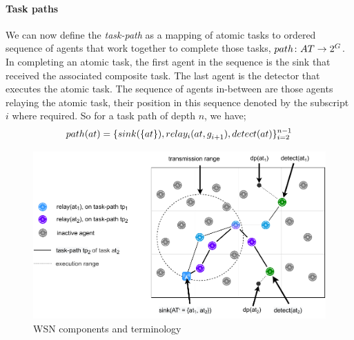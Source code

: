 
\paragraph{Task paths}
We can now define the \textit{task-path} as a mapping of atomic tasks to ordered sequence of agents that work together to complete those tasks, $\formalTaskArc{}{}$. In completing an atomic task, the first agent in the sequence is the sink that received the associated composite task. The last agent is the detector that executes the atomic task. The sequence of agents in-between are those agents relaying the atomic task, their position in this sequence denoted by the subscript $i$ where required. So for a task path of depth $n$, we have;
\begin{equation}
	\functionTaskArc{}{} = \lbrace \functionSinkRoleAtomic{}{}, \functionRelayRole{i}{i+1}, \functionDetectorRole{}{} \rbrace_{i=2}^{n-1}
\end{equation}
\begin{figure}
	\centering 
	\includegraphics[width=0.9\linewidth, trim={25pt 0pt 24pt 0pt, clip}]{grid_concept}
	\caption[WSN deployment terminology]{WSN components and terminology}
	\label{fig:grid_concept}
\end{figure}
